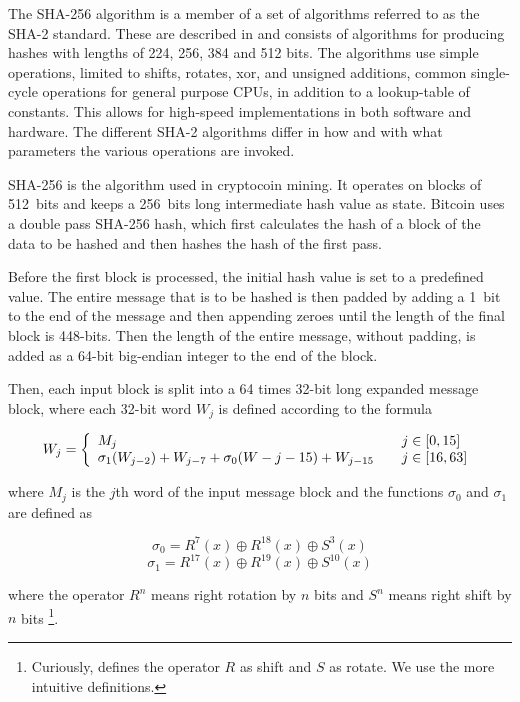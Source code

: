 The SHA-256 algorithm is a member of a set of algorithms referred to as the SHA-2 standard.
These are described in \cite{fips180-4} and consists of algorithms for producing hashes with lengths of 224, 256, 384 and 512 bits.
The algorithms use simple operations, limited to shifts, rotates, xor, and unsigned additions,
common single-cycle operations for general purpose CPUs, in addition to a lookup-table of constants.
This allows for high-speed implementations in both software and hardware. The different SHA-2 algorithms
differ in how and with what parameters the various operations are invoked.

SHA-256 is the algorithm used in cryptocoin mining. It operates on blocks of 512~bits and keeps
a 256~bits long intermediate hash value as state. Bitcoin uses a double pass SHA-256 hash, which
first calculates the hash of a block of the data to be hashed and then hashes the hash of the first
pass.

Before the first block is processed, the initial hash value is set to a predefined
value. The entire message that is to be hashed is then padded by adding a 1~bit to
the end of the message and then appending zeroes until the length of the final block
is 448-bits. Then the length of the entire message, without padding, is added as a
64-bit big-endian integer to the end of the block.

Then, each input block is split into a 64 times 32-bit long expanded message block, where
each 32-bit word $W_j$ is defined according to the formula

\[ W_j = \left\{
	\begin{array}{l l}
		M_j & \quad j \in \left[0, 15\right]\\
		\sigma_1(W_{j - 2}) + W_{j - 7} + \sigma_0(W-{j - 15}) + W_{j - 15} & \quad j \in \left[16, 63\right]
	\end{array}
\right.\]

\noindent where $M_j$ is the $j$th word of the input message block and the functions
$\sigma_0$ and $\sigma_1$ are defined as

\[\sigma_0 = R^7(x) \oplus R^{18}(x) \oplus S^3(x)\]
\[\sigma_1 = R^{17}(x) \oplus R^{19}(x) \oplus S^{10}(x)\]

\noindent where the operator $R^n$ means right rotation by $n$ bits and $S^n$ means right shift by $n$
bits \footnote{Curiously, \cite{sha-spec} defines the operator $R$ as shift and $S$ as rotate.
We use the more intuitive definitions.}.

